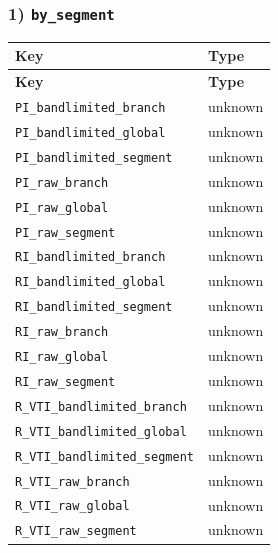 \documentclass[11pt]{article}
\begin{document}
\subsubsection*{1) \texttt{by\_\allowbreak{}segment}}
\begin{longtable}{|p{}|p{}|}
\hline
\textbf{Key} & \textbf{Type} \\ \hline
\endfirsthead
\hline
\textbf{Key} & \textbf{Type} \\ \hline
\endhead
\texttt{PI\_\allowbreak{}bandlimited\_\allowbreak{}branch} & unknown \\ \hline
\texttt{PI\_\allowbreak{}bandlimited\_\allowbreak{}global} & unknown \\ \hline
\texttt{PI\_\allowbreak{}bandlimited\_\allowbreak{}segment} & unknown \\ \hline
\texttt{PI\_\allowbreak{}raw\_\allowbreak{}branch} & unknown \\ \hline
\texttt{PI\_\allowbreak{}raw\_\allowbreak{}global} & unknown \\ \hline
\texttt{PI\_\allowbreak{}raw\_\allowbreak{}segment} & unknown \\ \hline
\texttt{RI\_\allowbreak{}bandlimited\_\allowbreak{}branch} & unknown \\ \hline
\texttt{RI\_\allowbreak{}bandlimited\_\allowbreak{}global} & unknown \\ \hline
\texttt{RI\_\allowbreak{}bandlimited\_\allowbreak{}segment} & unknown \\ \hline
\texttt{RI\_\allowbreak{}raw\_\allowbreak{}branch} & unknown \\ \hline
\texttt{RI\_\allowbreak{}raw\_\allowbreak{}global} & unknown \\ \hline
\texttt{RI\_\allowbreak{}raw\_\allowbreak{}segment} & unknown \\ \hline
\texttt{R\_\allowbreak{}VTI\_\allowbreak{}bandlimited\_\allowbreak{}branch} & unknown \\ \hline
\texttt{R\_\allowbreak{}VTI\_\allowbreak{}bandlimited\_\allowbreak{}global} & unknown \\ \hline
\texttt{R\_\allowbreak{}VTI\_\allowbreak{}bandlimited\_\allowbreak{}segment} & unknown \\ \hline
\texttt{R\_\allowbreak{}VTI\_\allowbreak{}raw\_\allowbreak{}branch} & unknown \\ \hline
\texttt{R\_\allowbreak{}VTI\_\allowbreak{}raw\_\allowbreak{}global} & unknown \\ \hline
\texttt{R\_\allowbreak{}VTI\_\allowbreak{}raw\_\allowbreak{}segment} & unknown \\ \hline

\end{longtable}
\end{document}
